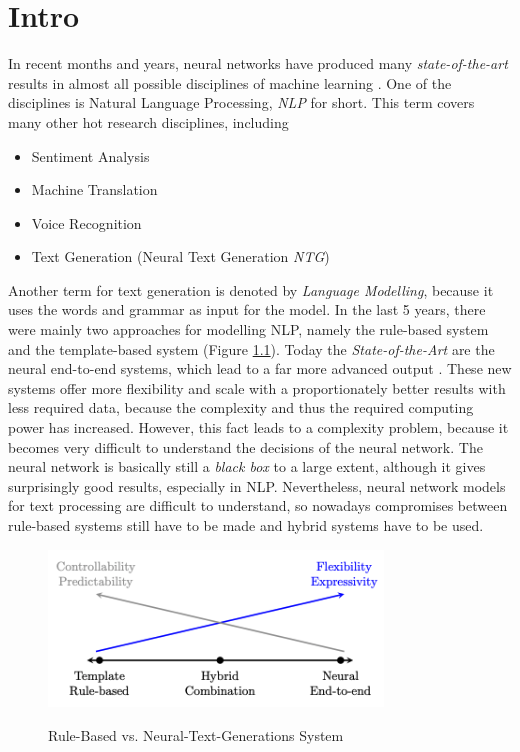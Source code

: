\chapter{Intro}\label{ch:intro}

In recent months and years, neural networks have produced many \textit{state-of-the-art} results in almost all possible disciplines of machine learning \cite{NTG}. One of the disciplines is Natural Language Processing, \textit{NLP} for short. This term covers many other hot research disciplines, including 

\begin{itemize}
\item Sentiment Analysis
\item Machine Translation
\item Voice Recognition
\item Text Generation (Neural Text Generation \textit{NTG})
\end{itemize}

Another term for text generation is denoted by \textit{Language Modelling}, because it uses the words and grammar as input for the model. In the last 5 years, there were mainly two approaches for modelling NLP, namely the rule-based system and the template-based system (Figure \ref{rules_based}). Today the \textit{State-of-the-Art} are the neural end-to-end systems, which lead to a far more advanced output \cite{End_to_End}. These new systems offer more flexibility and scale with a proportionately better results with less required data, because the complexity and thus the required computing power has increased. However, this fact leads to a complexity problem, because it becomes very difficult to understand the decisions of the neural network. The neural network is basically still a \textit{black box} to a large extent, although it gives surprisingly good results, especially in NLP. Nevertheless, neural network models for text processing are difficult to understand, so nowadays compromises between rule-based systems still have to be made and hybrid systems have to be used. 

\begin{figure}
  \begin{center}
  \includegraphics[width=3.5in]{photos/rule_based}\\
  \caption{Rule-Based vs. Neural-Text-Generations System \cite{NTG2}}\label{rules_based}
  \end{center}
\end{figure}

